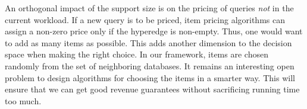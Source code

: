 An orthogonal impact of the support size is on the pricing of queries \emph{not} in the current workload. If a new query is to be priced, item pricing algorithms can assign a non-zero price only if the hyperedge is non-empty. Thus, one would want to add as many items as possible. This adds another dimension to the decision space when making the right choice. In our framework, items are chosen randomly from the set of neighboring databases. It remains an interesting open problem to design algorithms for choosing the items in a smarter way. This will ensure that we can get good revenue guarantees without sacrificing running time too much.

